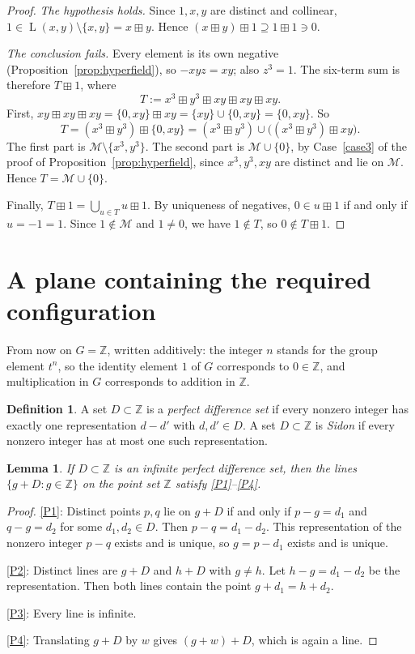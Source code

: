 \documentclass[11pt]{article}
\newtheorem{lemma}[theorem]{Lemma}
\theoremstyle{definition}
\newtheorem{definition}[theorem]{Definition}
\theoremstyle{remark}
\newcommand{\Z}{\mathbb{Z}}
\newcommand{\bp}{\boxplus}
\DeclareMathOperator{\Ln}{L}
\begin{document}
\begin{proof}
\emph{The hypothesis holds.} Since $1,x,y$ are distinct and collinear, $1\in\Ln(x,y)\setminus\{x,y\}=x\bp y$. Hence $(x\bp y)\bp 1\supseteq 1\bp 1\ni 0$.

\emph{The conclusion fails.} Every element is its own negative (Proposition~\ref{prop:hyperfield}), so $-xyz=xy$; also $z^3=1$. The six-term sum is therefore $T\bp 1$, where
\[
T:=x^3\bp y^3\bp xy\bp xy\bp xy .
\]
First, $xy\bp xy\bp xy=\{0,xy\}\bp xy=\{xy\}\cup\{0,xy\}=\{0,xy\}$. So
\[
T=(x^3\bp y^3)\bp\{0,xy\}=(x^3\bp y^3)\cup\bigl((x^3\bp y^3)\bp xy\bigr).
\]
The first part is $\mathcal M\setminus\{x^3,y^3\}$. The second part is $\mathcal M\cup\{0\}$, by Case~\ref{case3} of the proof of Proposition~\ref{prop:hyperfield}, since $x^3,y^3,xy$ are distinct and lie on $\mathcal M$. Hence $T=\mathcal M\cup\{0\}$.

Finally, $T\bp 1=\bigcup_{u\in T}u\bp 1$. By uniqueness of negatives, $0\in u\bp 1$ if and only if $u=-1=1$. Since $1\notin\mathcal M$ and $1\neq0$, we have $1\notin T$, so $0\notin T\bp 1$.
\end{proof}

\section{A plane containing the required configuration}

From now on $G=\Z$, written additively: the integer $n$ stands for the group element $t^n$, so the identity element $1$ of $G$ corresponds to $0\in\Z$, and multiplication in $G$ corresponds to addition in $\Z$.


\begin{definition}
A set $D\subset\Z$ is a \emph{perfect difference set} if every nonzero integer has exactly one representation $d-d'$ with $d,d'\in D$. A set $D\subset\Z$ is \emph{Sidon} if every nonzero integer has at most one such representation.
\end{definition}

\begin{lemma}\label{lem:plane}
If $D\subset\Z$ is an infinite perfect difference set, then the lines $\{g+D:g\in\Z\}$ on the point set $\Z$ satisfy \ref{P1}--\ref{P4}.
\end{lemma}

\begin{proof}
\ref{P1}: Distinct points $p,q$ lie on $g+D$ if and only if $p-g=d_1$ and $q-g=d_2$ for some $d_1,d_2\in D$. Then $p-q=d_1-d_2$. This representation of the nonzero integer $p-q$ exists and is unique, so $g=p-d_1$ exists and is unique.

\ref{P2}: Distinct lines are $g+D$ and $h+D$ with $g\neq h$. Let $h-g=d_1-d_2$ be the representation. Then both lines contain the point $g+d_1=h+d_2$.

\ref{P3}: Every line is infinite.

\ref{P4}: Translating $g+D$ by $w$ gives $(g+w)+D$, which is again a line.
\end{proof}
\end{document}

